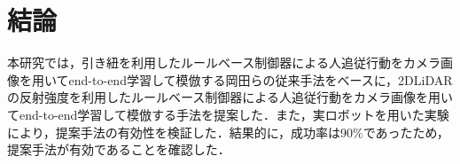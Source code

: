 \chapter{結論}
\label{end}

  本研究では，引き紐を利用したルールベース制御器による人追従行動をカメラ画像を用いてend-to-end学習して模倣する岡田らの従来手法をベースに，2DLiDARの反射強度を利用したルールベース制御器による人追従行動をカメラ画像を用いてend-to-end学習して模倣する手法を提案した．また，実ロボットを用いた実験により，提案手法の有効性を検証した．結果的に，成功率は90\%であったため，提案手法が有効であることを確認した．

%
% 
%
